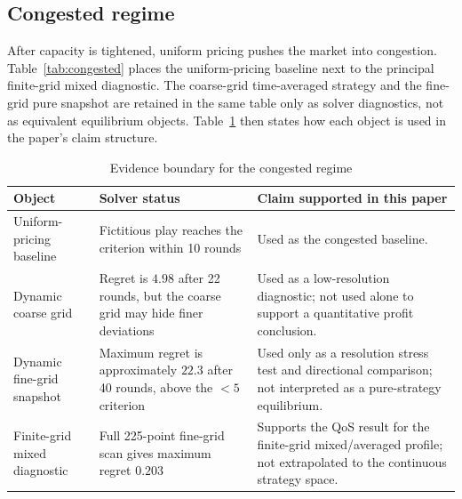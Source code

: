 \documentclass[11pt,a4paper]{article}
\begin{document}
\subsection{Congested regime}

After capacity is tightened, uniform pricing pushes the market into congestion. Table~\ref{tab:congested} places the uniform-pricing baseline next to the principal finite-grid mixed diagnostic. The coarse-grid time-averaged strategy and the fine-grid pure snapshot are retained in the same table only as solver diagnostics, not as equivalent equilibrium objects. Table~\ref{tab:evidence_boundary} then states how each object is used in the paper's claim structure.

\begin{table}[H]
\centering
\caption{Congested regime: main comparison and solver-diagnostic snapshots}
\label{tab:congested}
\small
{}
\end{table}

\begin{table}[H]
\centering
\caption{Evidence boundary for the congested regime}
\label{tab:evidence_boundary}
\small
\begin{tabular}{p{}p{}p{}}
\toprule
Object & Solver status & Claim supported in this paper \\
\midrule
Uniform-pricing baseline & Fictitious play reaches the criterion within 10 rounds & Used as the congested baseline. \\
Dynamic coarse grid & Regret is $4.98$ after 22 rounds, but the coarse grid may hide finer deviations & Used as a low-resolution diagnostic; not used alone to support a quantitative profit conclusion. \\
Dynamic fine-grid snapshot & Maximum regret is approximately $22.3$ after 40 rounds, above the $<5$ criterion & Used only as a resolution stress test and directional comparison; not interpreted as a pure-strategy equilibrium. \\
Finite-grid mixed diagnostic & Full 225-point fine-grid scan gives maximum regret $0.203$ & Supports the QoS result for the finite-grid mixed/averaged profile; not extrapolated to the continuous strategy space. \\
\bottomrule
\end{tabular}
\end{table}
\end{document}
